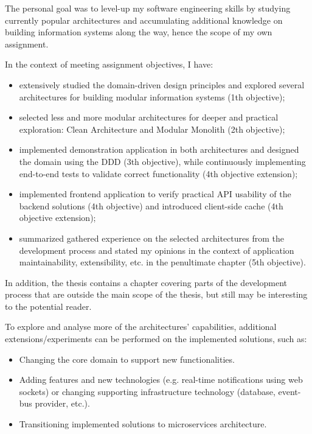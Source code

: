 The personal goal was to level-up my software engineering skills by studying currently popular architectures and accumulating additional knowledge on building information systems along the way, hence the scope of my own assignment.

In the context of meeting assignment objectives, I have:
\vspace{-7pt}
\begin{itemize}
    \item extensively studied the domain-driven design principles and explored several architectures for building modular information systems (1th objective);
    
    \item selected less and more modular architectures for deeper and practical exploration: Clean Architecture and Modular Monolith (2th objective);
    
    \item implemented demonstration application in both architectures and designed the domain using the DDD (3th objective), while continuously implementing end-to-end tests to validate correct functionality (4th objective extension);
    
    \item implemented frontend application to verify practical API usability of the backend solutions (4th objective) and introduced client-side cache (4th objective extension);
    
    \item summarized gathered experience on the selected architectures from the development process and stated my opinions in the context of application maintainability, extensibility, etc. in the penultimate chapter (5th objective).
\end{itemize}
\vspace{-5pt}
In addition, the thesis contains a chapter covering parts of the development process that are outside the main scope of the thesis, but still may be interesting to the potential reader.

To explore and analyse more of the architectures' capabilities, additional extensions/experiments can be performed on the implemented solutions, such as:
\vspace{-7pt}
\begin{itemize}
    \item Changing the core domain to support new functionalities.
    \item Adding features and new technologies (e.g. real-time notifications using web sockets) or changing supporting infrastructure technology (database, event-bus provider, etc.).
    \item Transitioning implemented solutions to microservices architecture.
\end{itemize}
\vspace{-50pt}
